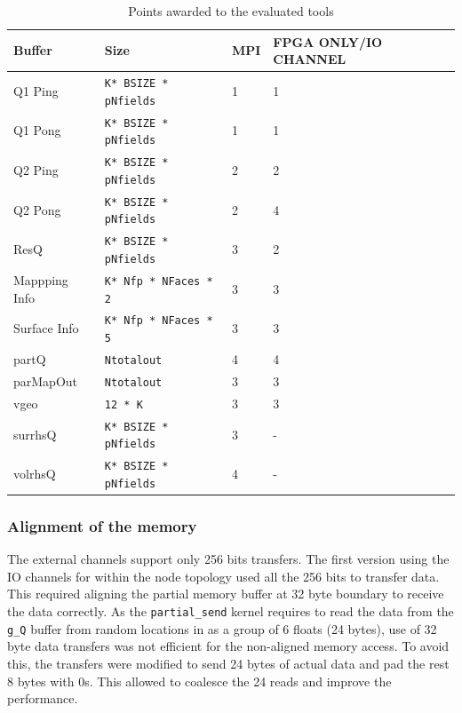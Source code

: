 \begin{table}[h]
    \begin{center}
        \caption{Points awarded to the evaluated tools}
        \label{tab:channel_assign}
        \begin{tabular}{|l|l|C{3cm}|C{3.4cm}|} %
          \hline
          \textbf{Buffer} & \textbf{Size} & \textbf{MPI} & \textbf{FPGA ONLY/IO CHANNEL}\\
          \hline
          Q1 Ping & \texttt{K* BSIZE * pNfields}  & 1 & 1 \\
          \hline
          Q1 Pong & \texttt{K* BSIZE * pNfields} & 1 & 1 \\
          \hline
          Q2 Ping & \texttt{K* BSIZE * pNfields}  & 2 & 2 \\
          \hline
          Q2 Pong & \texttt{K* BSIZE * pNfields}  & 2 & 4 \\
          \hline
          ResQ & \texttt{K* BSIZE * pNfields}  & 3 & 2 \\
          \hline
          Mappping Info & \texttt{K* Nfp * NFaces * 2}  & 3 & 3 \\
          \hline
          Surface Info & \texttt{K* Nfp * NFaces * 5} & 3 & 3 \\
          \hline
          partQ & \texttt{Ntotalout} & 4 & 4 \\
          \hline
          parMapOut & \texttt{Ntotalout}  & 3 & 3 \\
          \hline
          vgeo & \texttt{12 * K}  & 3 & 3 \\
          \hline
          surrhsQ & \texttt{K* BSIZE * pNfields}  & 3 & - \\
          \hline
          volrhsQ & \texttt{K* BSIZE * pNfields}  & 4 & - \\
          \hline
        \end{tabular}
    \end{center}
 \end{table}

\subsubsection*{Alignment of the memory}

The external channels support only 256 bits transfers. The first version
using the IO channels for within the node topology used all the 256 bits
to transfer data. This required aligning the partial memory buffer
at 32 byte boundary to receive the data correctly. As the \texttt{partial\_send}
kernel requires to read the data from the \texttt{g\_Q} buffer from random
locations in as a group of 6 floats (24 bytes), use of 32 byte data transfers
was not efficient for the non-aligned memory access. To avoid this, the transfers
were modified to send 24 bytes of actual data and pad the rest 8 bytes with 0s.
This allowed to coalesce the 24 reads and improve the performance.

